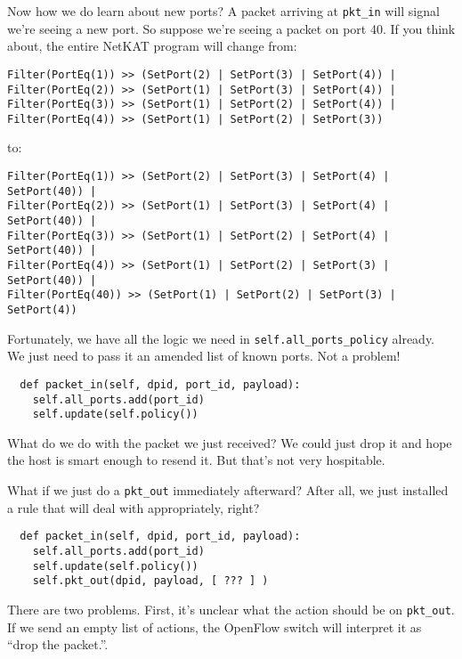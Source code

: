 Now how we do learn about new ports?  A packet arriving at \texttt{pkt\_in} will signal we're seeing a new port.
So suppose we're seeing a packet on port 40.  If you think about, the entire NetKAT program will change from:

\begin{verbatim}
Filter(PortEq(1)) >> (SetPort(2) | SetPort(3) | SetPort(4)) |
Filter(PortEq(2)) >> (SetPort(1) | SetPort(3) | SetPort(4)) |
Filter(PortEq(3)) >> (SetPort(1) | SetPort(2) | SetPort(4)) |
Filter(PortEq(4)) >> (SetPort(1) | SetPort(2) | SetPort(3))
\end{verbatim}

to:

\begin{verbatim}
Filter(PortEq(1)) >> (SetPort(2) | SetPort(3) | SetPort(4) | SetPort(40)) |
Filter(PortEq(2)) >> (SetPort(1) | SetPort(3) | SetPort(4) | SetPort(40)) |
Filter(PortEq(3)) >> (SetPort(1) | SetPort(2) | SetPort(4) | SetPort(40)) |
Filter(PortEq(4)) >> (SetPort(1) | SetPort(2) | SetPort(3) | SetPort(40)) |
Filter(PortEq(40)) >> (SetPort(1) | SetPort(2) | SetPort(3) | SetPort(4))
\end{verbatim}

Fortunately, we have all the logic we need in \texttt{self.all\_ports\_policy} already.  We just need
to pass it an amended list of known ports.  Not a problem!

\begin{verbatim}
  def packet_in(self, dpid, port_id, payload):
    self.all_ports.add(port_id)
    self.update(self.policy())
\end{verbatim}

What do we do with the packet we just received? 
We could just drop it and hope the host is smart enough to resend it.  But that's not
very hospitable.  

What if we just do a \texttt{pkt\_out} immediately afterward?  After all, we just installed a rule that
will deal with appropriately, right?

\begin{verbatim}
  def packet_in(self, dpid, port_id, payload):
    self.all_ports.add(port_id)
    self.update(self.policy())
    self.pkt_out(dpid, payload, [ ??? ] )
\end{verbatim}

There are two problems.  First, it's unclear what the action should be on \texttt{pkt\_out}.  If we send an empty 
list of actions, the OpenFlow switch will interpret it as ``drop the packet.''.  

